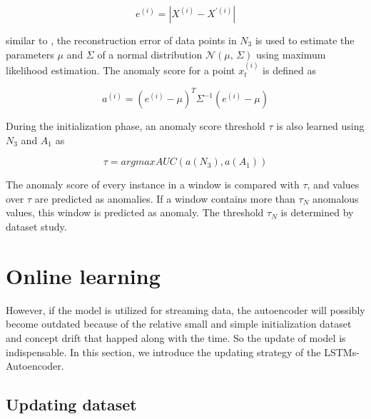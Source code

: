 \begin{equation} \label{eq:error}
e^{(i)}=\left| X^{(i)} - X^{'(i)} \right|
\end{equation}

similar to \cite{encdecad}, the reconstruction error of data points in $N_3$ is used to estimate the parameters $\mu$ and $\Sigma$ of a normal distribution $\mathcal{N}(\mu,\,\Sigma)$ using maximum likelihood estimation. The anomaly score for a point $x_t^{(i)}$ is defined as 

\begin{equation} \label{eq:score}
a^{(i)}={(e^{(i)}-\mu)}^{T}{\Sigma}^{-1}{(e^{(i)}-\mu)}
\end{equation}

During the initialization phase, an anomaly score threshold $\tau$ is also learned using $N_3$ and $A_1$ as

\begin{equation} \label{eq:threshold}
\tau = argmax AUC(a(N_3),a(A_1))
\end{equation}

The anomaly score of every instance in a window is compared with $\tau$, and values over $\tau$ are predicted as anomalies. If a window contains more than $\tau_N$ anomalous values, this window is predicted as anomaly. The threshold $\tau_N$ is determined by dataset study.\\

\section{Online learning}
\label{sec:Onlinelearning}
However, if the model is utilized for streaming data, the autoencoder will possibly become outdated because of the relative small and simple initialization dataset and concept drift that happed along with the time. So the update of model is indispensable. In this section, we introduce the updating strategy of the LSTMs-Autoencoder.

\subsection{Updating dataset}
\label{data}

